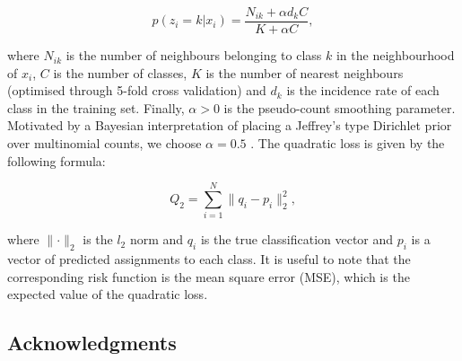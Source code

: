 \documentclass[10pt,letterpaper]{article}\usepackage[]{graphicx}\usepackage[]{color}
\begin{document}
\begin{equation}
p(z_i = k|x_i) = \frac{N_{ik} + \alpha d_k C}{K + \alpha C},
\end{equation}

where $N_{ik}$ is the number of neighbours belonging to class $k$ in
the neighbourhood of $x_i$, $C$ is the number of classes, $K$ is the
number of nearest neighbours (optimised through 5-fold cross
validation) and $d_k$ is the incidence rate of each class in the
training set. Finally, $\alpha >0$ is the pseudo-count smoothing
parameter. Motivated by a Bayesian interpretation of placing a
Jeffrey's type Dirichlet prior over multinomial counts, we choose
$\alpha = 0.5$ \cite{Hazimeh:2015, Valcarce:2016, Manning:2008}.  The
quadratic loss is given by the following formula:

\begin{equation}
  Q_2 = \sum_{i = 1}^{N}\lVert q_i - p_i\rVert_2^2,
\end{equation}

where $\lVert\cdot\rVert_2$ is the $l_2$ norm and $q_i$ is the true
classification vector and $p_i$ is a vector of predicted assignments
to each class. It is useful to note that the corresponding risk
function is the mean square error (MSE), which is the expected value
of the quadratic loss.





\subsection*{Acknowledgments}
\end{document}
